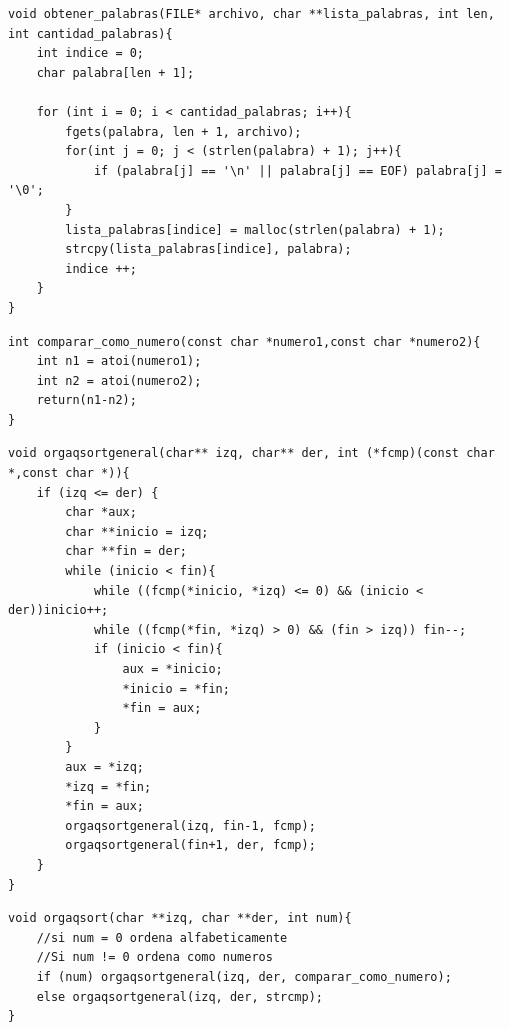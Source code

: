 \documentclass[a4paper, 12pt]{article}
\begin{document}
	\begin{lstlisting}
void obtener_palabras(FILE* archivo, char **lista_palabras, int len, int cantidad_palabras){
    int indice = 0;
    char palabra[len + 1];

    for (int i = 0; i < cantidad_palabras; i++){
        fgets(palabra, len + 1, archivo);
        for(int j = 0; j < (strlen(palabra) + 1); j++){
            if (palabra[j] == '\n' || palabra[j] == EOF) palabra[j] = '\0';
        }
        lista_palabras[indice] = malloc(strlen(palabra) + 1);
        strcpy(lista_palabras[indice], palabra);
        indice ++;
    }
}
	\end{lstlisting}
	
	\begin{lstlisting}
int comparar_como_numero(const char *numero1,const char *numero2){
    int n1 = atoi(numero1);
    int n2 = atoi(numero2);
    return(n1-n2);
}
	\end{lstlisting}
	
	\begin{lstlisting}
void orgaqsortgeneral(char** izq, char** der, int (*fcmp)(const char *,const char *)){
    if (izq <= der) {
        char *aux;
        char **inicio = izq;
        char **fin = der;
        while (inicio < fin){
            while ((fcmp(*inicio, *izq) <= 0) && (inicio < der))inicio++;
            while ((fcmp(*fin, *izq) > 0) && (fin > izq)) fin--;
            if (inicio < fin){
                aux = *inicio;
                *inicio = *fin;
                *fin = aux;
            }
        }
        aux = *izq;
        *izq = *fin;
        *fin = aux;
        orgaqsortgeneral(izq, fin-1, fcmp);
        orgaqsortgeneral(fin+1, der, fcmp);
    }
}
	\end{lstlisting}
	
	\begin{lstlisting}
void orgaqsort(char **izq, char **der, int num){
    //si num = 0 ordena alfabeticamente
    //Si num != 0 ordena como numeros
    if (num) orgaqsortgeneral(izq, der, comparar_como_numero);
    else orgaqsortgeneral(izq, der, strcmp);
}
	\end{lstlisting}
	
\end{document}
